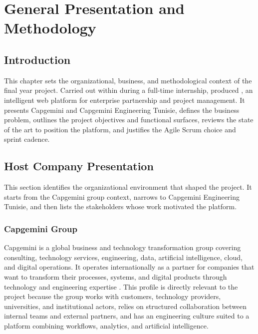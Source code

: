 \chapter{General Presentation and Methodology}
\section*{Introduction}
This chapter sets the organizational, business, and methodological context of the final year project. Carried out within \reportcompany{} during a full-time internship, \reporttitle{} produced \projectname{}, an intelligent web platform for enterprise partnership and project management. It presents Capgemini and Capgemini Engineering Tunisie, defines the business problem, outlines the project objectives and functional surfaces, reviews the state of the art to position the platform, and justifies the Agile Scrum choice and sprint cadence.
\section{Host Company Presentation}
This section identifies the organizational environment that shaped the project. It starts from the Capgemini group context, narrows to Capgemini Engineering Tunisie, and then lists the stakeholders whose work motivated the platform.
\subsection{Capgemini Group}
Capgemini is a global business and technology transformation group covering consulting, technology services, engineering, data, artificial intelligence, cloud, and digital operations. It operates internationally as a partner for companies that want to transform their processes, systems, and digital products through technology and engineering expertise . This profile is directly relevant to the project because the group works with customers, technology providers, universities, and institutional actors, relies on structured collaboration between internal teams and external partners, and has an engineering culture suited to a platform combining workflows, analytics, and artificial intelligence.
